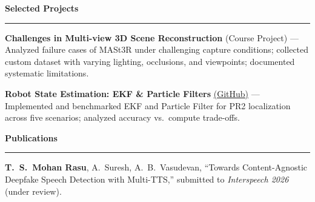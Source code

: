 \documentclass[9pt]{article}
\newcommand{\sect}[1]{\vspace{4pt}\noindent\textbf{\large #1}\vspace{3pt}\hrule\vspace{6pt}}
\begin{document}
\sect{Selected Projects}

\textbf{Challenges in Multi-view 3D Scene Reconstruction} (Course Project) --- Analyzed failure cases of MASt3R under challenging capture conditions; collected custom dataset with varying lighting, occlusions, and viewpoints; documented systematic limitations.

\textbf{Robot State Estimation: EKF \& Particle Filters} \href{https://github.com/Thiruloksundar/robot_state_estimation}{(GitHub)} --- Implemented and benchmarked EKF and Particle Filter for PR2 localization across five scenarios; analyzed accuracy vs.\ compute trade-offs.

\sect{Publications}

\textbf{T.\ S.\ Mohan Rasu}, A.\ Suresh, A.\ B.\ Vasudevan, ``Towards Content-Agnostic Deepfake Speech Detection with Multi-TTS,'' submitted to \emph{Interspeech 2026} (under review).
\end{document}
